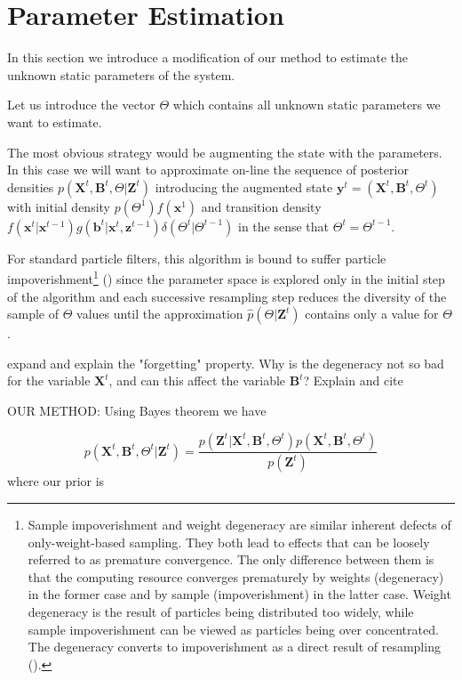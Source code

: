 \documentclass[11pt,a4paper]{article}
\renewcommand{\vec}[1]{\mathbf{#1}}
\begin{document}
\section{Parameter Estimation}
In this section we introduce a modification of our method to estimate the unknown static parameters of the system.

Let us introduce the vector $\Theta$ which contains all unknown static parameters we want to estimate.

The most obvious strategy would be augmenting the state with the parameters. In this case we will want to approximate on-line the sequence of posterior densities $p(\vec{X}^t, \vec{B}^t, \Theta | \vec{Z}^t)$ introducing the augmented state $\vec{y}^t = (\vec{X}^t, \vec{B}^t, \Theta^t)$ with initial density $p(\Theta^1)f(\vec{x}^1)$ and transition density $f(\vec{x}^t | \vec{x}^{t-1}) g(\vec{b}^t | \vec{x}^t, \vec{z}^{t-1}) \delta (\Theta^t | \Theta^{t-1})$ in the sense that $\Theta^t = \Theta^{t-1}$.

For standard particle filters, this algorithm is bound to suffer particle impoverishment\footnote[1]{Sample impoverishment and weight degeneracy are similar inherent defects of only-weight-based sampling. They both lead to effects that can be loosely referred to as premature convergence. The only difference between them is that the computing resource converges prematurely by weights (degeneracy) in the former case and by sample (impoverishment) in the latter case.
Weight degeneracy is the result of particles being distributed too widely, while sample impoverishment can be viewed as particles being over concentrated. The degeneracy converts to impoverishment as a direct result of resampling (\cite{Wang}).} (\cite{Kantas}) since the parameter space is explored only in the initial step of the algorithm and each successive resampling step reduces the diversity of the sample of $\Theta$ values until the approximation $\hat{p}(\Theta | \vec{Z}^t)$ contains only a value for $\Theta$.

{\color{red}expand and explain the "forgetting" property. Why is the degeneracy not so bad for the variable $\vec{X}^t$, and can this affect the variable $\vec{B}^t$? Explain and cite \cite{Chopin}}

OUR METHOD:
Using Bayes theorem we have

\begin{equation*}
    p(\vec{X}^t, \vec{B}^t, \Theta^t | \vec{Z}^t) = \frac{p(\vec{Z}^t | \vec{X}^t, \vec{B}^t, \Theta^t) p(\vec{X}^t, \vec{B}^t, \Theta^t)}{p(\vec{Z}^t)}
\end{equation*}
where our prior is
\end{document}
